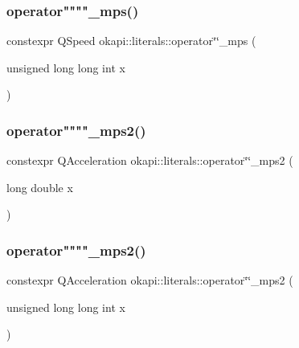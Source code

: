 \mbox{\label{namespaceokapi_1_1literals_a9a35e99b1d8505b3aaf1b1d40fce5a48}} 
\subsubsection{\texorpdfstring{operator""""\_mps()}{operator""\_mps()}\hspace{0.1cm}{\footnotesize\ttfamily [2/2]}}
{\footnotesize\ttfamily constexpr Q\+Speed okapi\+::literals\+::operator\char`\"{}\char`\"{}\+\_\+mps (\begin{DoxyParamCaption}\item[{unsigned long long int}]{x }\end{DoxyParamCaption})}

\mbox{\label{namespaceokapi_1_1literals_a7aa45f65867b1b8c864d0c600a7a4cbc}} 
\subsubsection{\texorpdfstring{operator""""\_mps2()}{operator""\_mps2()}\hspace{0.1cm}{\footnotesize\ttfamily [1/2]}}
{\footnotesize\ttfamily constexpr Q\+Acceleration okapi\+::literals\+::operator\char`\"{}\char`\"{}\+\_\+mps2 (\begin{DoxyParamCaption}\item[{long double}]{x }\end{DoxyParamCaption})}

\mbox{\label{namespaceokapi_1_1literals_a7eada23b332074941b1264ffe7b65035}} 
\subsubsection{\texorpdfstring{operator""""\_mps2()}{operator""\_mps2()}\hspace{0.1cm}{\footnotesize\ttfamily [2/2]}}
{\footnotesize\ttfamily constexpr Q\+Acceleration okapi\+::literals\+::operator\char`\"{}\char`\"{}\+\_\+mps2 (\begin{DoxyParamCaption}\item[{unsigned long long int}]{x }\end{DoxyParamCaption})}

